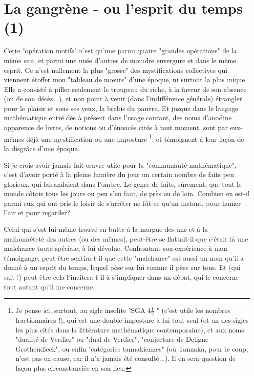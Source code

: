 \section{La gangrène - ou l'esprit du temps (1)}

Cette "opération motifs" n'est qu'une parmi quatre "grandes opérations" de la même eau, et parmi une nuée d'autres de moindre envergure et dans le même esprit. Ce n'est nullement la plus "grosse" des mystifications collectives qui viennent étoffer mon "tableau de mœurs" d'une époque, ni surtout la plus inique. Elle a consisté à piller seulement le troupeau du riche, à la faveur de son absence (ou de son décès...), et non point à venir (dans l'indifférence générale) étrangler pour le plaisir et sous ses yeux, la brebis du pauvre. Et jusque dans le langage mathématique entré dès à présent dans l'usage courant, des noms d'anodine apparence de livres, de notions ou d'énoncés cités à tout moment, sont par eux-mêmes déjà une mystification ou une imposture \footnote{Je pense ici, surtout, au sigle insolite "SGA $4 \frac{1}{2}$ " (c'est utile les nombres fractionnaires !), qui est une double imposture à lui tout seul (et un des sigles les plus cités dans la littérature mathématique contemporaine), et aux noms "dualité de Verdier" ou "dual de Verdier", "conjecture de Deligne-Grothendieck", ou enfin "catégories tannakiennes" (où Tannaka, pour le coup, n'est pas en cause, car il n'a jamais été consulté...). Il en sera question de façon plus circonstanciée en son lieu.}, et témoignent à leur façon de la disgrâce d'une époque.

Si je crois avoir jamais fait œuvre utile pour la "communauté mathématique", c'est d'avoir porté à la pleine lumière du jour un certain nombre de faits peu glorieux, qui faisandaient dans l'ombre. Le genre de faits, sûrement, que tout le monde côtoie tous les jours ou peu s'en faut, de près ou de loin. Combien en est-il parmi eux qui ont pris le loisir de s'arrêter ne fût-ce qu'un instant, pour humer l'air et pour regarder?

Celui qui s'est lui-même trouvé en butte à la morgue des uns et à la malhonnêteté des autres (ou des mêmes), peut-être se flattait-il que c'était là une malchance toute spéciale, à lui dévolue. Confrontant son expérience à mon témoignage, peut-être sentira-t-il que cette "malchance" est aussi un nom qu'il a donné à un esprit du temps, lequel pèse sur lui comme il pèse sur tous. Et (qui sait !) peut-être cela l'incitera-t-il à s'impliquer dans un débat, qui le concerne tout autant qu'il me concerne.

